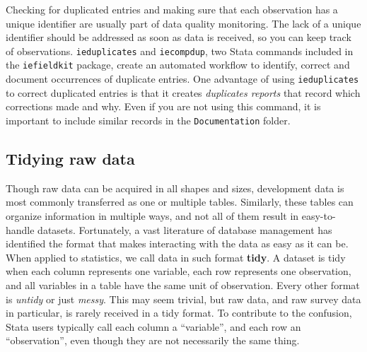 Checking for duplicated entries and making sure that each observation has a unique identifier are usually part of data quality monitoring.
The lack of a unique identifier should be addressed as soon as data is received,
so you can keep track of observations.
\texttt{ieduplicates} and \texttt{iecompdup},
two Stata commands included in the \texttt{iefieldkit}
package,
create an automated workflow to identify, correct and document
occurrences of duplicate entries.
One advantage of using \texttt{ieduplicates} 
to correct duplicated entries is that it creates \textit{duplicates reports}
that record which corrections made and why.
Even if you are not using this command,
it is important to include similar records in the \texttt{Documentation} folder.

\subsection{Tidying raw data}

Though raw data can be acquired in all shapes and sizes,
development data is most commonly transferred as one or multiple tables.
Similarly, these tables can organize information in multiple ways,
and not all of them result in easy-to-handle datasets.
Fortunately, a vast literature of database management has identified the format
that makes interacting with the data as easy as it can be.
When applied to statistics, we call data in such format \textbf{tidy}.
A dataset is tidy when each column represents one variable,
each row represents one observation, 
and all variables in a table have the same unit of observation.
Every other format is \textit{untidy} or just \textit{messy}.
This may seem trivial, but raw data, 
and raw survey data in particular,
is rarely received in a tidy format.
To contribute to the confusion, 
Stata users typically call each column a ``variable'', 
and each row an ``observation'',
even though they are not necessarily the same thing.

